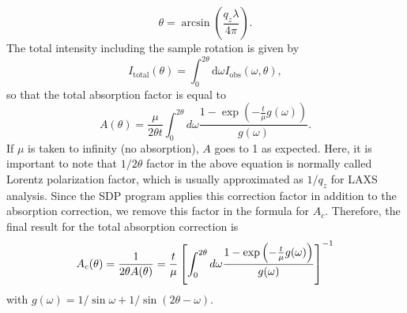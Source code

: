 \documentclass[letterpaper,12pt]{article}
\newcommand{\+}{^{\dagger}}%
\begin{document}
\begin{equation}
  \theta = \arcsin\left(\frac{q_z\lambda}{4\pi}\right).
\end{equation}
The total intensity including the sample rotation is given by
\begin{equation}
  I_{\textrm{total}}(\theta) = \int_0^{2\theta}\textrm{d}\omega I_{\textrm{obs}}(\omega,\theta),
\end{equation}
so that the total absorption factor is equal to
\begin{equation}
  A(\theta) = \frac{\mu}{2\theta t} \int_0^{2\theta}d\omega 
      \frac{1-\exp\left(-\frac{t}{\mu}g(\omega)\right)}{g(\omega)}.
\end{equation}
If $\mu$ is taken to infinity (no absorption), $A$ goes to 1 as expected. 
Here, it is important to note that $1/2\theta$ factor in the above equation
is normally called Lorentz polarization factor, which
is usually approximated as $1/q_z$ for LAXS analysis. Since the SDP
program applies this correction factor in addition to the absorption
correction, we remove this factor in the formula for $A_c$. Therefore,
the final result for the total absorption correction is 
\begin{equation}
  A_c(\theta) 
    = \frac{1}{2\theta A(\theta)} \nonumber \\
    = \frac{t}{\mu} 
       \left[ 
         \int_0^{2\theta}d\omega 
         \frac{1-\exp\left(-\frac{t}{\mu}g(\omega)\right)}{g(\omega)}
       \right]^{-1}
\end{equation}
with $g(\omega)=1/\sin\omega+1/\sin(2\theta-\omega)$.
\end{document}
